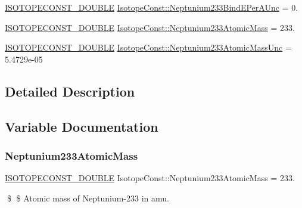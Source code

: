 \begin{DoxyCompactItemize}
\mbox{\hyperlink{group___isotope_const-_macros_ga8f45a7272ce02c0b4c65c44636ed719a}{I\+S\+O\+T\+O\+P\+E\+C\+O\+N\+S\+T\+\_\+\+D\+O\+U\+B\+LE}} \mbox{\hyperlink{group___isotope_const-_neptunium-_np233_ga2cd3a6b1b0f2f06bb1b0f93da2a3785b}{Isotope\+Const\+::\+Neptunium233\+Bind\+E\+Per\+A\+Unc}} = 0.
\item 
\mbox{\hyperlink{group___isotope_const-_macros_ga8f45a7272ce02c0b4c65c44636ed719a}{I\+S\+O\+T\+O\+P\+E\+C\+O\+N\+S\+T\+\_\+\+D\+O\+U\+B\+LE}} \mbox{\hyperlink{group___isotope_const-_neptunium-_np233_ga4cbf4871c722f1b4e4dc0569589024aa}{Isotope\+Const\+::\+Neptunium233\+Atomic\+Mass}} = 233.
\item 
\mbox{\hyperlink{group___isotope_const-_macros_ga8f45a7272ce02c0b4c65c44636ed719a}{I\+S\+O\+T\+O\+P\+E\+C\+O\+N\+S\+T\+\_\+\+D\+O\+U\+B\+LE}} \mbox{\hyperlink{group___isotope_const-_neptunium-_np233_ga27047cae6faf8c62a9eec44956355eac}{Isotope\+Const\+::\+Neptunium233\+Atomic\+Mass\+Unc}} = 5.\+4729e-\/05
\end{DoxyCompactItemize}


\subsection{Detailed Description}


\subsection{Variable Documentation}
\mbox{\label{group___isotope_const-_neptunium-_np233_ga4cbf4871c722f1b4e4dc0569589024aa}} 
\subsubsection{\texorpdfstring{Neptunium233\+Atomic\+Mass}{Neptunium233AtomicMass}}
{\footnotesize\ttfamily \mbox{\hyperlink{group___isotope_const-_macros_ga8f45a7272ce02c0b4c65c44636ed719a}{I\+S\+O\+T\+O\+P\+E\+C\+O\+N\+S\+T\+\_\+\+D\+O\+U\+B\+LE}} Isotope\+Const\+::\+Neptunium233\+Atomic\+Mass = 233.}

\$ \$ Atomic mass of Neptunium-\/233 in amu. \mbox{\label{group___isotope_const-_neptunium-_np233_ga27047cae6faf8c62a9eec44956355eac}} 
